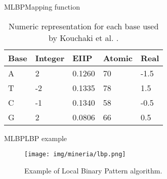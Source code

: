 \documentclass[10pt]{beamer}
\newcommand{\1}{
	\setbeamertemplate{background}{
		\texttt{[image: img/1\_dna]}
		\tikz[overlay] \fill[fill opacity=0.75,fill=white] (0,0) rectangle (-\paperwidth,\paperheight);
	}
}
\begin{document}
\begin{frame}{MLBP}{Mapping function}
	\begin{table}[h]
		\centering
		\caption{Numeric representation for each base used by Kouchaki et al. \cite{kouchaki2019signal}.}
		\label{tab:chen_numeric}
		\setlength{\tabcolsep}{0.5em} %
		{\renewcommand{\arraystretch}{1}%
			\begin{tabular}{lllll}
				\hline
				Base           	&  Integer & EIIP & Atomic  & Real \\ \hline
				A      			& 2 & 0.1260 & 70 & -1.5 \\ 
				T          	   	& -2 & 0.1335 & 78 & 1.5 \\ 
				C      			& -1 & 0.1340 & 58 & -0.5 \\ 
				G				& 2 & 0.0806 & 66 & 0.5 \\ \hline
			\end{tabular}
		}
	\end{table}
\end{frame}

\begin{frame}{MLBP}{LBP example}
	\begin{figure}[]
		\centering
		\texttt{[image: img/mineria/lbp.png]}
		\label{img:mot2}
		\caption{Example of Local Binary Pattern algorithm. }
	\end{figure}
\end{frame}
\end{document}
